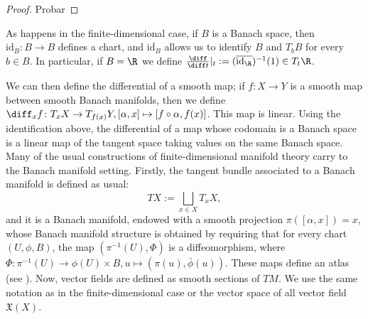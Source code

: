 \begin{proof}
    {\color{red} Probar}
\end{proof}

\begin{obs}
    As happens in the finite-dimensional case, if \(B\) is a Banach space, then \(\mathrm{id}_B\colon B \to B\) defines a chart, and \(\overline{\mathrm{id}_B}\) allows us to identify \(B\) and \(T_bB\) for every \(b \in B\). In particular, if \(B=\R\) we define \(\frac{\diff}{\diff t}|_{t}:=(\overline{\mathrm{id}_\R})^{-1}(1)\in T_t\R\).
\end{obs}
We can then define the differential of a smooth map; if \(f \colon X \to Y\) is a smooth map between smooth Banach manifolds, then we define \(\diff_xf\colon T_xX\to T_{f(x)}Y, [\alpha, x] \mapsto [f \circ \alpha, f(x)]\). This map is linear. Using the identification above, the differential of a map whose codomain is a Banach space is a linear map of the tangent space taking values on the same Banach space. \\

Many of the usual constructions of finite-dimensional manifold theory carry to the Banach manifold setting. Firstly, the tangent bundle associated to a Banach manifold is defined as usual:
\[
TX:=\bigsqcup_{x\in X} T_xX,
\]
and it is a Banach manifold, endowed with a smooth projection \(\pi([\alpha, x])=x\), whose Banach manifold structure is obtained by requiring that for every chart \((U, \phi, B)\), the map \((\pi^{-1}(U), \Phi)\) is a diffeomorphism, where \(\Phi\colon \pi^{-1}(U)\to \phi(U) \times B, u \mapsto(\pi(u), \bar\phi(u))\). These maps define an atlas (see \parencite[Sec. 1.1.5]{Schmeding_2022}). Now, vector fields are defined as smooth sections of \(TM\). We use the same notation as in the finite-dimensional case or the vector space of all vector field \(\mathfrak{X}(X)\).

